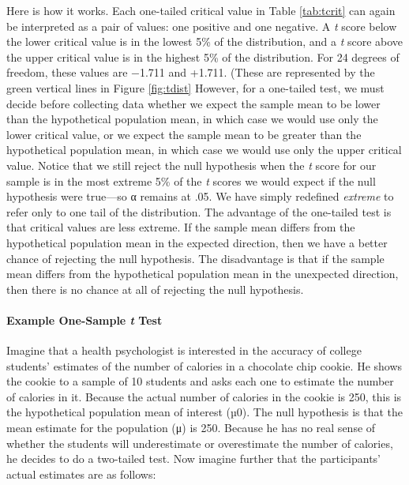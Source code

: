 \documentclass[
]{krantz}
\begin{document}
Here is how it works. Each one-tailed critical value in Table \ref{tab:tcrit} can again be interpreted as a pair of values: one positive and one negative. A \emph{t} score below the lower critical value is in the lowest 5\% of the distribution, and a \emph{t} score above the upper critical value is in the highest 5\% of the distribution. For 24 degrees of freedom, these values are −1.711 and +1.711. (These are represented by the green vertical lines in Figure \ref{fig:tdist} However, for a one-tailed test, we must decide before collecting data whether we expect the sample mean to be lower than the hypothetical population mean, in which case we would use only the lower critical value, or we expect the sample mean to be greater than the hypothetical population mean, in which case we would use only the upper critical value. Notice that we still reject the null hypothesis when the \emph{t} score for our sample is in the most extreme 5\% of the \emph{t} scores we would expect if the null hypothesis were true---so α remains at .05. We have simply redefined \emph{extreme} to refer only to one tail of the distribution. The advantage of the one-tailed test is that critical values are less extreme. If the sample mean differs from the hypothetical population mean in the expected direction, then we have a better chance of rejecting the null hypothesis. The disadvantage is that if the sample mean differs from the hypothetical population mean in the unexpected direction, then there is no chance at all of rejecting the null hypothesis.

\paragraph*{\texorpdfstring{Example One-Sample \emph{t} Test}{Example One-Sample t Test}}\label{example-one-sample-t-test}

Imagine that a health psychologist is interested in the accuracy of college students' estimates of the number of calories in a chocolate chip cookie. He shows the cookie to a sample of 10 students and asks each one to estimate the number of calories in it. Because the actual number of calories in the cookie is 250, this is the hypothetical population mean of interest (µ0). The null hypothesis is that the mean estimate for the population (μ) is 250. Because he has no real sense of whether the students will underestimate or overestimate the number of calories, he decides to do a two-tailed test. Now imagine further that the participants' actual estimates are as follows:
\end{document}
